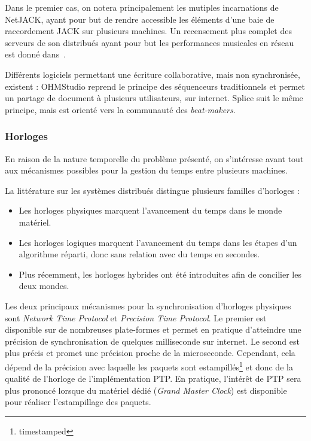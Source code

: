\documentclass{article}
\begin{document}
Dans le premier cas, on notera principalement les mutiples incarnations de NetJACK\cite{carot2009netjack}, 
ayant pour but de rendre accessible les éléments d'une baie de raccordement JACK sur plusieurs machines. Un recensement plus complet des serveurs de son distribués ayant pour but les performances musicales en réseau est donné dans~\cite{carot2007networked}. 

Différents logiciels permettant une écriture collaborative, mais non synchronisée, existent : 
OHMStudio\cite{koszolko2015crowdsourcing} reprend le principe des séquenceurs traditionnels et permet un partage de document à plusieurs utilisateurs, sur internet.
Splice\cite{pignato2015deterritorialized} suit le même principe, mais est orienté vers la communauté des \emph{beat-makers}.


\subsubsection{Horloges}
En raison de la nature temporelle du problème présenté, on s'intéresse avant tout aux mécanismes possibles pour la gestion du temps entre plusieurs machines.

La littérature sur les systèmes distribués distingue plusieurs familles d'horloges : 
\begin{itemize}
    \item Les horloges physiques marquent l'avancement du temps dans le monde matériel.
    \item Les horloges logiques marquent l'avancement du temps dans les étapes d'un algorithme réparti, donc sans relation avec du temps en secondes.
    \item Plus récemment, les horloges hybrides ont été introduites afin de concilier les deux mondes.
\end{itemize}

Les deux principaux mécanismes pour la synchronisation d'horloges physiques sont \emph{Network Time Protocol}\cite{mills1991internet} et \emph{Precision Time Protocol}\cite{peng2009research}. 
Le premier est disponible sur de nombreuses plate-formes et permet en pratique d'atteindre une précision de synchronisation de quelques milliseconde sur internet. 
Le second est plus précis et promet une précision proche de la microseconde. 
Cependant, cela dépend de la précision avec laquelle les paquets sont estampillés\footnote{timestamped} et donc de la qualité de l'horloge de l'implémentation PTP. 
En pratique, l'intérêt de PTP sera plus prononcé lorsque du matériel dédié (\emph{Grand Master Clock}) est disponible pour réaliser l'estampillage des paquets.
\end{document}
